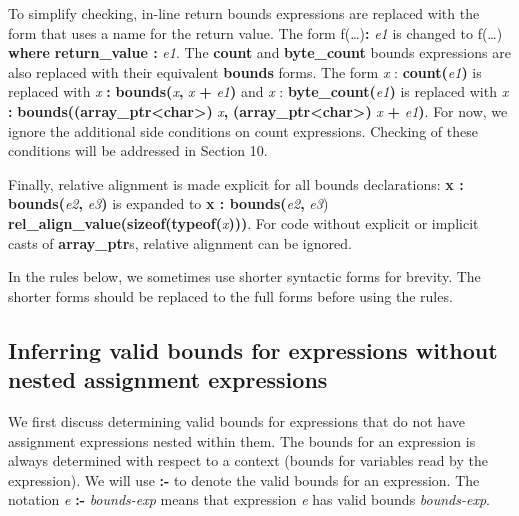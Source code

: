 \documentclass[]{article}
\begin{document}
To simplify checking, in-line return bounds expressions are replaced
with the form that uses a name for the return value. The form
f(\ldots{})\textbf{:} \emph{e1} is changed to f(\ldots{}) \textbf{where}
\textbf{return\_value :} \emph{e1}. The \textbf{count} and
\textbf{byte\_count} bounds expressions are also replaced with their
equivalent \textbf{bounds} forms. The form \emph{x} :
\textbf{count(}\emph{e1}\textbf{)} is replaced with \emph{x} \textbf{:}
\textbf{bounds(}\emph{x}\textbf{,} \emph{x} \textbf{+}
\emph{e1}\textbf{)} and \emph{x} :
\textbf{byte\_count(}\emph{e1}\textbf{)} is replaced with \emph{x}
\textbf{:} \textbf{bounds((array\_ptr\textless{}char\textgreater{})}
\emph{x}\textbf{,} \textbf{(array\_ptr\textless{}char\textgreater{})}
\emph{x} \textbf{+} \emph{e1}\textbf{)}. For now, we ignore the
additional side conditions on count expressions. Checking of these
conditions will be addressed in Section 10.

Finally, relative alignment is made explicit for all bounds
declarations: \textbf{x : bounds(}\emph{e2}\textbf{,}
\emph{e3}\textbf{)} is expanded to \textbf{x :
bounds(}\emph{e2}\textbf{,} \emph{e3})
\textbf{rel\_align\_value(sizeof(typeof(}\emph{x}\textbf{)))}. For code
without explicit or implicit casts of \textbf{array\_ptr}s, relative
alignment can be ignored.

In the rules below, we sometimes use shorter syntactic forms for
brevity. The shorter forms should be replaced to the full forms before
using the rules.

\subsection{\texorpdfstring{\protect\hypertarget{ux5fToc435434948}{}{\protect\hypertarget{ux5fToc437460774}{}{\protect\hypertarget{ux5fToc440445453}{}{\protect\hypertarget{ux5fToc440449235}{}{\protect\hypertarget{ux5fToc440551885}{}{}}}}}Inferring
valid bounds for expressions without nested assignment
expressions}{Inferring valid bounds for expressions without nested assignment expressions}}\label{inferring-valid-bounds-for-expressions-without-nested-assignment-expressions}

We first discuss determining valid bounds for expressions that do not
have assignment expressions nested within them. The bounds for an
expression is always determined with respect to a context (bounds for
variables read by the expression). We will use \textbf{:-} to denote the
valid bounds for an expression. The notation \emph{e} \textbf{:-}
\emph{bounds-exp} means that expression \emph{e} has valid bounds
\emph{bounds-exp}.
\end{document}
